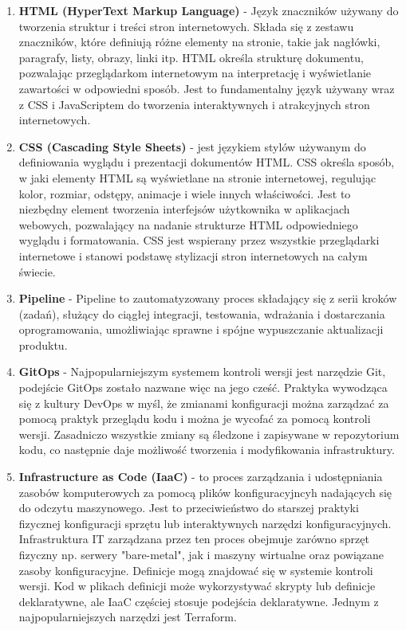 \begin{enumerate}
    \item {\bf HTML (HyperText Markup Language)} - Język znaczników używany do tworzenia struktur i treści stron internetowych. Składa się z zestawu znaczników, które definiują różne elementy na stronie, takie jak nagłówki, paragrafy, listy, obrazy, linki itp. HTML określa strukturę dokumentu, pozwalając przeglądarkom internetowym na interpretację i wyświetlanie zawartości w odpowiedni sposób. Jest to fundamentalny język używany wraz z CSS i JavaScriptem do tworzenia interaktywnych i atrakcyjnych stron internetowych.
    
    \item {\bf CSS (Cascading Style Sheets)} - jest językiem stylów używanym do definiowania wyglądu i prezentacji dokumentów HTML. CSS określa sposób, w jaki elementy HTML są wyświetlane na stronie internetowej, regulując kolor, rozmiar, odstępy, animacje i wiele innych właściwości. Jest to niezbędny element tworzenia interfejsów użytkownika w aplikacjach webowych, pozwalający na nadanie strukturze HTML odpowiedniego wyglądu i formatowania. CSS jest wspierany przez wszystkie przeglądarki internetowe i stanowi podstawę stylizacji stron internetowych na całym świecie.

    \item {\bf Pipeline} - Pipeline to zautomatyzowany proces składający się z serii kroków (zadań), służący do ciągłej integracji, testowania, wdrażania i dostarczania oprogramowania, umożliwiając sprawne i spójne wypuszczanie aktualizacji produktu.

    \item {\bf GitOps} - Najpopularniejszym systemem kontroli wersji jest narzędzie Git, podejście GitOps zostało nazwane więc na jego cześć. Praktyka wywodząca się z kultury DevOps w myśl, że zmianami konfiguracji można zarządzać za pomocą praktyk przeglądu kodu i można je wycofać za pomocą kontroli wersji. Zasadniczo wszystkie zmiany są śledzone i zapisywane w repozytorium kodu, co następnie daje możliwość tworzenia i modyfikowania infrastruktury.

    \item {\bf Infrastructure as Code (IaaC)} - to proces zarządzania i udostępniania zasobów komputerowych za pomocą plików konfiguracyjncyh nadających się do odczytu maszynowego. Jest to przeciwieństwo do starszej praktyki fizycznej konfiguracji sprzętu lub interaktywnych narzędzi konfiguracyjnych. Infrastruktura IT zarządzana przez ten proces obejmuje zarówno sprzęt fizyczny np. serwery "bare-metal", jak i maszyny wirtualne oraz powiązane zasoby konfiguracyjne. Definicje mogą znajdować się w systemie kontroli wersji. Kod w plikach definicji może wykorzystywać skrypty lub definicje deklaratywne, ale IaaC częściej stosuje podejścia deklaratywne. Jednym z najpopularniejszych narzędzi jest Terraform.
     
 \end{enumerate}